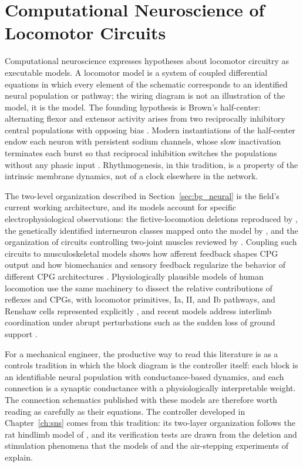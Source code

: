 \section{Computational Neuroscience of Locomotor Circuits}\label{sec:bg_compneuro}

Computational neuroscience expresses hypotheses about locomotor circuitry as executable models. A locomotor model is a system of coupled differential equations in which every element of the schematic corresponds to an identified neural population or pathway; the wiring diagram is not an illustration of the model, it is the model. The founding hypothesis is Brown's half-center: alternating flexor and extensor activity arises from two reciprocally inhibitory central populations with opposing bias \citep{brown_intrinsic_1911}. Modern instantiations of the half-center endow each neuron with persistent sodium channels, whose slow inactivation terminates each burst so that reciprocal inhibition switches the populations without any phasic input \citep{deng_neuromechanical_2019}. Rhythmogenesis, in this tradition, is a property of the intrinsic membrane dynamics, not of a clock elsewhere in the network.

The two-level organization described in Section~\ref{sec:bg_neural} is the field's current working architecture, and its models account for specific electrophysiological observations: the fictive-locomotion deletions reproduced by \citet{rybak_modelling_2006}, the genetically identified interneuron classes mapped onto the model by \citet{rybak_organization_2015}, and the organization of circuits controlling two-joint muscles reviewed by \citet{shevtsova_modeling_2016}. Coupling such circuits to musculoskeletal models shows how afferent feedback shapes CPG output \citep{markin_afferent_2010} and how biomechanics and sensory feedback regularize the behavior of different CPG architectures \citep{deng_biomechanical_2022}. Physiologically plausible models of human locomotion use the same machinery to dissect the relative contributions of reflexes and CPGs, with locomotor primitives, Ia, II, and Ib pathways, and Renshaw cells represented explicitly \citep{dirusso_investigating_2023}, and recent models address interlimb coordination under abrupt perturbations such as the sudden loss of ground support \citep{shinohara_mechanisms_2025}.

For a mechanical engineer, the productive way to read this literature is as a controls tradition in which the block diagram is the controller itself: each block is an identifiable neural population with conductance-based dynamics, and each connection is a synaptic conductance with a physiologically interpretable weight. The connection schematics published with these models are therefore worth reading as carefully as their equations. The controller developed in Chapter~\ref{ch:sns} comes from this tradition: its two-layer organization follows the rat hindlimb model of \citet{deng_neuromechanical_2019}, and its verification tests are drawn from the deletion and stimulation phenomena that the models of \citet{rybak_modelling_2006} and the air-stepping experiments of \citet{selionov_tonic_2009} explain.

